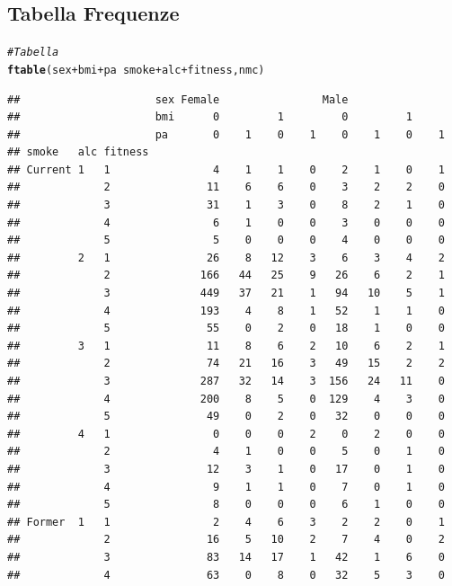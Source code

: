 \documentclass{article}\usepackage[]{graphicx}\usepackage[]{xcolor}
\makeatletter
\newcommand{\hlcom}[1]{\textcolor[rgb]{0.678,0.584,0.686}{\textit{#1}}}%
\newcommand{\hlopt}[1]{\textcolor[rgb]{0,0,0}{#1}}%
\newcommand{\hlstd}[1]{\textcolor[rgb]{0.345,0.345,0.345}{#1}}%
\newcommand{\hlkwd}[1]{\textcolor[rgb]{0.737,0.353,0.396}{\textbf{#1}}}%
\newenvironment{kframe}{%
 \def\at@end@of@kframe{}%
 \ifinner\ifhmode%
  \def\at@end@of@kframe{\end{minipage}}%
  \begin{minipage}{\columnwidth}%
 \fi\fi%
 \def\FrameCommand##1{\hskip\@totalleftmargin \hskip-\fboxsep
 \colorbox{shadecolor}{##1}\hskip-\fboxsep
     \hskip-\linewidth \hskip-\@totalleftmargin \hskip\columnwidth}%
 \MakeFramed {\advance\hsize-\width
   \@totalleftmargin\z@ \linewidth\hsize
   \@setminipage}}%
 {\par\unskip\endMakeFramed%
 \at@end@of@kframe}
\newenvironment{knitrout}{}{} %
\makeatother
\begin{document}
  \subsection{Tabella Frequenze}
\begin{knitrout}
\color{fgcolor}\begin{kframe}
\begin{alltt}
\hlcom{#Tabella}
\hlkwd{ftable}\hlstd{(sex}\hlopt{+}\hlstd{bmi}\hlopt{+}\hlstd{pa} \hlopt{~} \hlstd{smoke}\hlopt{+}\hlstd{alc}\hlopt{+}\hlstd{fitness, nmc)}
\end{alltt}
\begin{verbatim}
##                     sex Female                Male               
##                     bmi      0         1         0         1     
##                     pa       0    1    0    1    0    1    0    1
## smoke   alc fitness                                              
## Current 1   1                4    1    1    0    2    1    0    1
##             2               11    6    6    0    3    2    2    0
##             3               31    1    3    0    8    2    1    0
##             4                6    1    0    0    3    0    0    0
##             5                5    0    0    0    4    0    0    0
##         2   1               26    8   12    3    6    3    4    2
##             2              166   44   25    9   26    6    2    1
##             3              449   37   21    1   94   10    5    1
##             4              193    4    8    1   52    1    1    0
##             5               55    0    2    0   18    1    0    0
##         3   1               11    8    6    2   10    6    2    1
##             2               74   21   16    3   49   15    2    2
##             3              287   32   14    3  156   24   11    0
##             4              200    8    5    0  129    4    3    0
##             5               49    0    2    0   32    0    0    0
##         4   1                0    0    0    2    0    2    0    0
##             2                4    1    0    0    5    0    1    0
##             3               12    3    1    0   17    0    1    0
##             4                9    1    1    0    7    0    1    0
##             5                8    0    0    0    6    1    0    0
## Former  1   1                2    4    6    3    2    2    0    1
##             2               16    5   10    2    7    4    0    2
##             3               83   14   17    1   42    1    6    0
##             4               63    0    8    0   32    5    3    0

\end{verbatim}
\end{kframe}
\end{knitrout}
\end{document}
